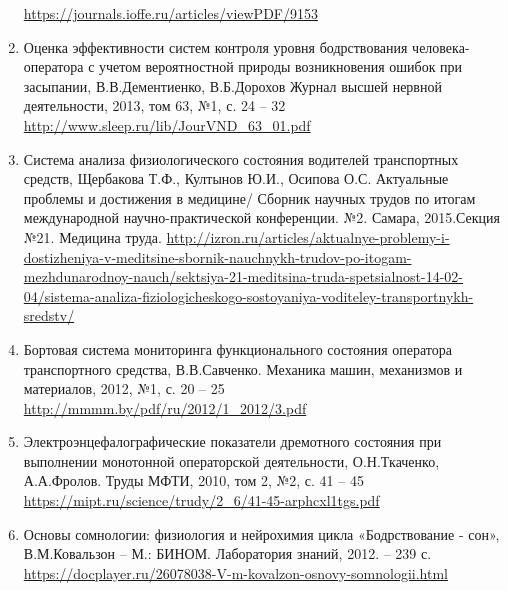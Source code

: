 \begin{enumerate}
    \url{https://journals.ioffe.ru/articles/viewPDF/9153}
    \item Оценка эффективности систем контроля уровня бодрствования человека-оператора с учетом вероятностной природы возникновения ошибок при засыпании, В.В.Дементиенко, В.Б.Дорохов
    Журнал высшей нервной деятельности, 2013, том 63, №1, с. 24 – 32
    \url{http://www.sleep.ru/lib/JourVND_63_01.pdf}
    \item Система анализа физиологического состояния водителей транспортных средств, Щербакова Т.Ф., Култынов Ю.И., Осипова О.С. Актуальные проблемы и достижения в медицине/ Сборник научных трудов по итогам международной научно-практической конференции. №2. Самара, 2015.Секция №21. Медицина труда.
    \url{http://izron.ru/articles/aktualnye-problemy-i-dostizheniya-v-meditsine-sbornik-nauchnykh-trudov-po-itogam-mezhdunarodnoy-nauch/sektsiya-21-meditsina-truda-spetsialnost-14-02-04/sistema-analiza-fiziologicheskogo-sostoyaniya-voditeley-transportnykh-sredstv/}
    \item Бортовая система мониторинга функционального состояния оператора транспортного средства, В.В.Савченко. Механика машин, механизмов и материалов, 2012, №1,  с. 20 – 25
    \url{http://mmmm.by/pdf/ru/2012/1_2012/3.pdf}
    \item Электроэнцефалографические показатели дремотного состояния при выполнении монотонной операторской деятельности, О.Н.Ткаченко, А.А.Фролов. Труды МФТИ, 2010, том 2, №2, с. 41 – 45
    \url{https://mipt.ru/science/trudy/2_6/41-45-arphcxl1tgs.pdf}
    \item Основы сомнологии: физиология и нейрохимия цикла «Бодрствование - сон», В.М.Ковальзон – М.: БИНОМ. Лаборатория знаний, 2012. – 239 с.
    \url{https://docplayer.ru/26078038-V-m-kovalzon-osnovy-somnologii.html} 
\end{enumerate}
